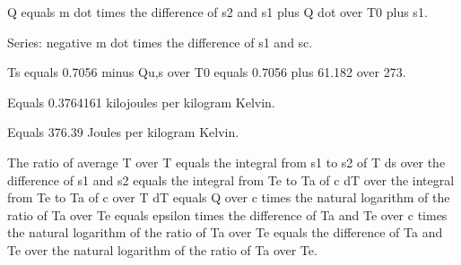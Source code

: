 Q equals m dot times the difference of s2 and s1 plus Q dot over T0 plus s1.

Series: negative m dot times the difference of s1 and sc.

Ts equals 0.7056 minus Qu,s over T0 equals 0.7056 plus 61.182 over 273.

Equals 0.3764161 kilojoules per kilogram Kelvin.

Equals 376.39 Joules per kilogram Kelvin.

The ratio of average T over T equals the integral from s1 to s2 of T ds over the difference of s1 and s2 equals the integral from Te to Ta of c dT over the integral from Te to Ta of c over T dT equals Q over c times the natural logarithm of the ratio of Ta over Te equals epsilon times the difference of Ta and Te over c times the natural logarithm of the ratio of Ta over Te equals the difference of Ta and Te over the natural logarithm of the ratio of Ta over Te.